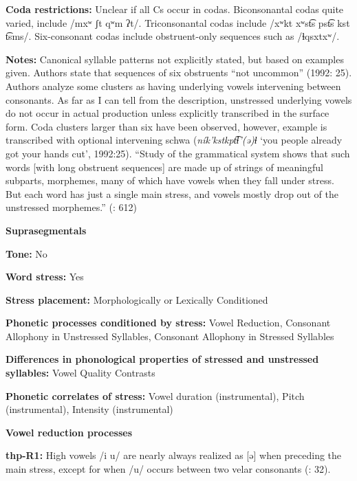 \textbf{Coda restrictions:} Unclear if all Cs occur in codas. Biconsonantal codas quite varied, include /mxʷ ʃt qʷm ʔt/. Triconsonantal codas include /xʷkt xʷst͡s pst͡s kst t͡sms/. Six-consonant codas include obstruent-only sequences such as /ɬqsxtxʷ/.



\textbf{Notes:} Canonical syllable patterns not explicitly stated, but based on examples given. Authors state that sequences of six obstruents “not uncommon” (1992: 25). Authors analyze some clusters as having underlying vowels intervening between consonants. As far as I can tell from the description, unstressed underlying vowels do not occur in actual production unless explicitly transcribed in the surface form. Coda clusters larger than six have been observed, however, example is transcribed with optional intervening schwa (\textit{ník’kstkpt͡ɬ’(ə)ɬ} ‘you people already got your hands cut’, 1992:25). “Study of the grammatical system shows that such words [with long obstruent sequences] are made up of strings of meaningful subparts, morphemes, many of which have vowels when they fall under stress. But each word has just a single main stress, and vowels mostly drop out of the unstressed morphemes.” (\citealt{ThompsonEtAl1996}: 612)



\textbf{Suprasegmentals}



\textbf{Tone:} No



\textbf{Word stress:} Yes



\textbf{Stress placement:} Morphologically or Lexically Conditioned



\textbf{Phonetic processes conditioned by stress:} Vowel Reduction, Consonant Allophony in Unstressed Syllables, Consonant Allophony in Stressed Syllables



\textbf{Differences in phonological properties of stressed and unstressed syllables:} Vowel Quality Contrasts



\textbf{Phonetic correlates of stress:} Vowel duration (instrumental), Pitch (instrumental), Intensity (instrumental)



\textbf{Vowel reduction processes}



\textbf{thp-R1:} High vowels /i u/ are nearly always realized as [ə] when preceding the main stress, except for when /u/ occurs between two velar consonants (\citealt{ThompsonThompson1992}: 32).



